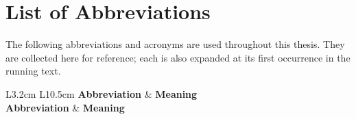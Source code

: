 \chapter*{List of Abbreviations}

The following abbreviations and acronyms are used throughout this thesis. They
are collected here for reference; each is also expanded at its first occurrence
in the running text.

\begin{longtable}{L{3.2cm} L{10.5cm}}
\toprule
\textbf{Abbreviation} & \textbf{Meaning} \\
\midrule
\endfirsthead
\toprule
\textbf{Abbreviation} & \textbf{Meaning} \\
\midrule
\endhead
\midrule
{} \\
\endfoot
\bottomrule
\endlastfoot


\end{longtable}
